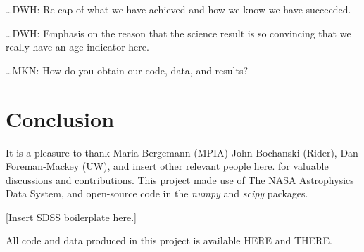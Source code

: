 \documentclass[12pt, preprint]{aastex}
\newcommand{\project}[1]{\textsl{#1}}
\begin{document}


\ldots DWH: Re-cap of what we have achieved and how we know we have
succeeded.

\ldots DWH: Emphasis on the reason that the science result is so
convincing that we really have an age indicator here.

\ldots MKN: How do you obtain our code, data, and results?

\section{Conclusion} 

\acknowledgments
It is a pleasure to thank Maria Bergemann (MPIA)
  John Bochanski (Rider),
  Dan Foreman-Mackey (UW), and
insert other relevant people here.
for valuable discussions and contributions.
This project made use of
  The NASA Astrophysics Data System,
  and open-source code in the \project{numpy} and \project{scipy} packages.

[Insert SDSS boilerplate here.]

All code and data produced in this project is available HERE and THERE.


\end{document}
